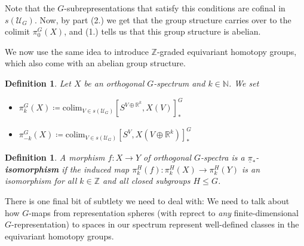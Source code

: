 \documentclass{scrartcl}
\newcommand{\textbi}[1]{\textbf{\textit{#1}}}
\newcommand{\bN}{\mathbb{N}}
\newcommand{\bZ}{\mathbb{Z}}
\newcommand{\bR}{\mathbb{R}}
\newcommand{\colim}{\mathrm{colim}}
\newtheorem{defin}[subsection]{Definition}
\begin{document}
Note that the $G$-subrepresentations that satisfy this conditions are cofinal in $s(\mathcal{U}_G)$. Now, by part (2.) we get that the group structure carries over to the colimit $\pi^G_0(X)$, and (1.) tells us that this group structure is abelian. 

We now use the same idea to introduce $\bZ$-graded equivariant homotopy groups, which also come with an abelian group structure. 

\begin{defin}
    Let $X$ be an orthogonal $G$-spectrum and $k\in\bN$. We set
    \begin{itemize}
        \item $\pi^G_k(X)\coloneqq\colim_{V\in s(\mathcal{U}_G)}[S^{V\oplus \bR^k},X(V)]^G_*$
        \item $\pi^G_{-k}(X)\coloneqq\colim_{V\in s(\mathcal{U}_G)}[S^{V},X(V\oplus \bR^k)]^G_*$
    \end{itemize}
\end{defin}

\begin{defin}
    A morphism $f:X\to Y$ of orthogonal $G$-spectra is a $\underline{\pi}_*$-\textbi{isomorphism} if the induced map $\pi^H_k(f):\pi^H_k(X)\to\pi^H_k(Y)$ is an isomorphism for all $k\in\bZ$ and all closed subgroups $H\leq G$.
\end{defin}

There is one final bit of subtlety we need to deal with: We need to talk about how $G$-maps from representation spheres (with reprect to \textit{any} finite-dimensional $G$-representation) to spaces in our spectrum represent well-defined classes in the equivariant homotopy groups.
\end{document}
